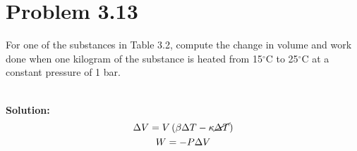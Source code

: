 \documentclass{article}
\newenvironment{solution}{\par\noindent\textbf{\\Solution:\\}}{\par\medskip}
\begin{document}
\pagebreak

\section*{Problem 3.13}
For one of the substances in Table 3.2, compute the change in volume and work done when one kilogram of the substance is heated from 15$^\circ$C to 25$^\circ$C at a constant pressure of 1 bar.

\begin{solution}
      \begin{gather*}
            \Delta V=V\left( \beta \Delta T-\kappa \cancel{\Delta T}   \right)\\
            W=-P\Delta V
      \end{gather*}
      \vspace{-1em}
      \begin{center}
\end{center}
\end{solution}
\end{document}

